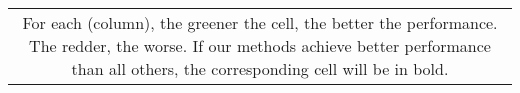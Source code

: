 \begin{table*}[htbp]
\begin{tabular}{c|cccccc|cccccc|cccc}
    \bottomrule
    \bottomrule
    \multicolumn{17}{m{0.75\textwidth}}{\scriptsize For each (column), the greener the cell, the better the performance. The redder, the worse. If our methods achieve better performance than all others, the corresponding cell will be in bold.}
    \end{tabular}%
\label{tab:results_no_validation}%
\end{table*}%

